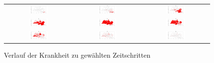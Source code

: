 \documentclass[11pt,a4paper]{article}
\begin{document}
\begin{figure}
\begin{tabular}{ccc}
  \includegraphics[width=0.3\textwidth]{bild1-1} &
  \includegraphics[width=0.3\textwidth]{bild1-10} &
\includegraphics[width=0.3\textwidth]{bild1-20} \\
  \includegraphics[width=0.3\textwidth]{bild1-30} &
  \includegraphics[width=0.3\textwidth]{bild1-40} &
  \includegraphics[width=0.3\textwidth]{bild1-50} \\
  \includegraphics[width=0.3\textwidth]{bild1-60} &  
  \includegraphics[width=0.3\textwidth]{bild1-70} &  
   \includegraphics[width=0.3\textwidth]{bild1-80} \\
\end{tabular}
\caption{Verlauf der Krankheit zu gew\"ahlten Zeitschritten}
\end{figure}
\end{document}
